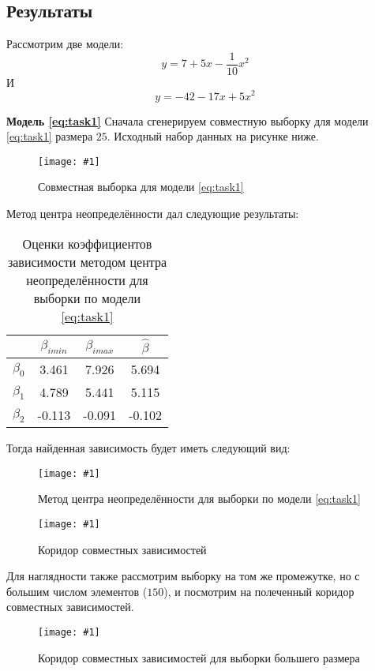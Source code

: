 \documentclass[a4paper,12pt]{article}
\newcommand{\plot}[3]{
    \begin{figure}[H]
        \texttt{[image: \#1]}
        \caption{#2}
        \label{#3}
    \end{figure}
}
\begin{document}
    \subsection{Результаты}
    Рассмотрим две модели:
    \begin{equation}
        y = 7 + 5x - \frac{1}{10}x^{2}
        \label{eq:task1}
    \end{equation}
    \noindent И
    \begin{equation}
        y = -42 - 17x + 5x^{2}
        \label{eq:task2}
    \end{equation}

    \noindent\textbf{Модель \ref{eq:task1}} \newline
    Сначала сгенерируем совместную выборку для модели \ref{eq:task1} размера $ 25 $. Исходный набор данных на рисунке ниже.
    \plot{ValidData25}{Совместная выборка для модели \ref{eq:task1}}{p:validdata25}
    
    \noindent Метод центра неопределённости дал следующие результаты:
    \begin{table}[H]
        \begin{center}
            \begin{tabular}{| c | c | c | c |}
                \hline
                & $ \beta_{imin} $ & $ \beta_{imax} $ & $ \hat{\beta} $ \\
                \hline
                $ \beta_{0} $ & 3.461 & 7.926 & 5.694 \\
                \hline
                $ \beta_{1} $ & 4.789 & 5.441 & 5.115 \\
                \hline
                $ \beta_{2} $ & -0.113 & -0.091 & -0.102 \\
                \hline
            \end{tabular}
        \end{center}
        \caption{Оценки коэффициентов зависимости методом центра неопределённости для выборки по модели \ref{eq:task1}}
        \label{t:validdata25}
    \end{table}

    \noindent Тогда найденная зависимость будет иметь следующий вид:
    \plot{UndefinedcenterValidData25}{Метод центра неопределённости для выборки по модели \ref{eq:task1}}{p:ucvaliddata25}
    \plot{CorridorUndefinedCenterValidData25}{Коридор совместных зависимостей}{p:corridorvaliddata25}

    \noindent Для наглядности также рассмотрим выборку на том же промежутке, но с большим числом элементов ($ 150 $), и посмотрим на полеченный коридор совместных зависимостей.
    \plot{CorridorUndefinedCenterValidData150}{Коридор совместных зависимостей для выборки большего размера}{p:corridorvaliddata150}
\end{document}
